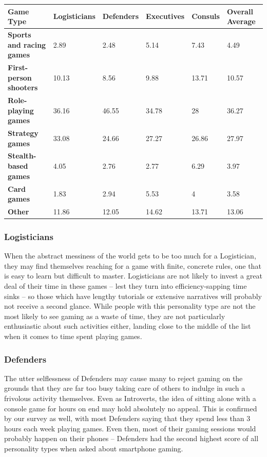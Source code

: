 \documentclass{article}
\begin{document}
\begin{table}[htp]
\begin{tabular}{|l|l|l|l|l|l|}
\hline
\textbf{Game Type} & \textbf{Logisticians} & \textbf{Defenders} & \textbf{Executives} & \textbf{Consuls} & \textbf{Overall Average} \\ \hline
\textbf{Sports and racing games} &2.89           &2.48           &5.14           &7.43           &4.49           \\ \hline
\textbf{First-person shooters} & 10.13          &8.56           & 9.88          &13.71           &10.57           \\ \hline
\textbf{Role-playing games} &36.16           &46.55           &34.78           &28           & 36.27          \\ \hline
\textbf{Strategy games} &33.08           & 24.66          &          27.27 &26.86           & 27.97          \\ \hline
\textbf{Stealth-based games} & 4.05          & 2.76          &  2.77         &6.29           &3.97           \\ \hline
\textbf{Card games} &1.83           & 2.94          &          5.53 & 4          & 3.58          \\ \hline
\textbf{Other} &11.86           &12.05           &         14.62 &  13.71         &  13.06         \\ \hline
\end{tabular}
\end{table}

\subsubsection{Logisticians}
When the abstract messiness of the world gets to be too much for a Logistician, they may find themselves reaching for a game with finite, concrete rules, one that is easy to learn but difficult to master. Logisticians are not likely to invest a great deal of their time in these games – lest they turn into efficiency-sapping time sinks – so those which have lengthy tutorials or extensive narratives will probably not receive a second glance. While people with this personality type are not the most likely to see gaming as a waste of time, they are not particularly enthusiastic about such activities either, landing close to the middle of the list when it comes to time spent playing games.
\subsubsection{Defenders}
The utter selflessness of Defenders may cause many to reject gaming on the grounds that they are far too busy taking care of others to indulge in such a frivolous activity themselves. Even as Introverts, the idea of sitting alone with a console game for hours on end may hold absolutely no appeal. This is confirmed by our survey as well, with most Defenders saying that they spend less than 3 hours each week playing games. Even then, most of their gaming sessions would probably happen on their phones – Defenders had the second highest score of all personality types when asked about smartphone gaming.
\end{document}
